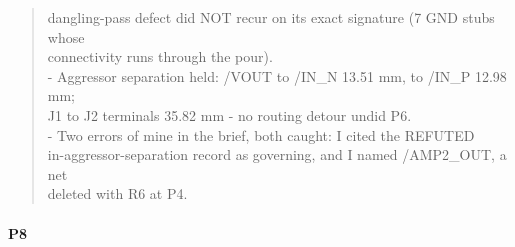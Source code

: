 \documentclass[11pt,a4paper]{article}
\begin{document}
\begin{quote}
  dangling-pass defect did NOT recur on its exact signature (7 GND stubs whose\\
  connectivity runs through the pour).\\
- Aggressor separation held: /VOUT to /IN\_N 13.51 mm, to /IN\_P 12.98 mm;\\
  J1 to J2 terminals 35.82 mm - no routing detour undid P6.\\
- Two errors of mine in the brief, both caught: I cited the REFUTED\\
  in-aggressor-separation record as governing, and I named /AMP2\_OUT, a net\\
  deleted with R6 at P4.
\end{quote}
\paragraph*{P8}
\end{document}
